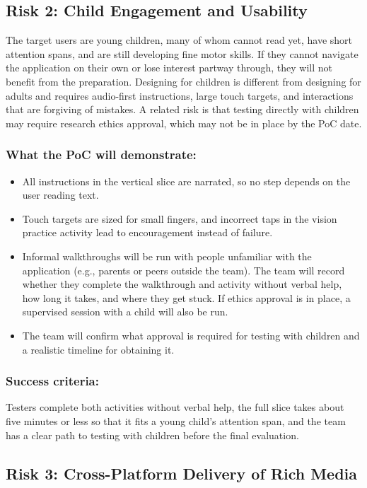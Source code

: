 \documentclass{article}
\begin{document}
\subsection{Risk 2: Child Engagement and Usability}

The target users are young children, many of whom cannot read yet, have short
attention spans, and are still developing fine motor skills. If they cannot
navigate the application on their own or lose interest partway through, they
will not benefit from the preparation. Designing for children is different from
designing for adults and requires audio-first instructions, large touch targets,
and interactions that are forgiving of mistakes. A related risk is that testing
directly with children may require research ethics approval, which may not be
in place by the PoC date.

\subsubsection*{What the PoC will demonstrate:}
\begin{itemize}
  \item All instructions in the vertical slice are narrated, so no step
  depends on the user reading text.
  \item Touch targets are sized for small fingers, and incorrect taps in the
  vision practice activity lead to encouragement instead of failure.
  \item Informal walkthroughs will be run with people unfamiliar with the
  application (e.g., parents or peers outside the team). The team will record
  whether they complete the walkthrough and activity without verbal help, how
  long it takes, and where they get stuck. If ethics approval is in place, a
  supervised session with a child will also be run.
  \item The team will confirm what approval is required for testing with
  children and a realistic timeline for obtaining it.
\end{itemize}

\subsubsection*{Success criteria:}
Testers complete both activities without verbal
help, the full slice takes about five minutes or less so that it fits a young
child's attention span, and the team has a clear path to testing with children
before the final evaluation.

\subsection{Risk 3: Cross-Platform Delivery of Rich Media}
\end{document}
